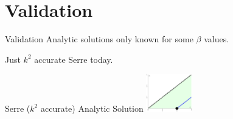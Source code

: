 \documentclass[pdf]{beamer}
\begin{document}
\section{Validation}
\begin{frame}{Validation}
Analytic solutions only known for some $\beta$ values. 

\bigskip
Just $k^2$ accurate Serre today.
\end{frame}

\begin{frame}{
	Serre ($k^2$ accurate) Analytic Solution \hfill \hfill \hfill \hfill \includegraphics[width=2cm]{./Pics/Tex/Explanatory/MiniRegions/Serre.pdf}}
\begin{figure}
	\centering

\end{figure}
\end{frame}
\end{document}
